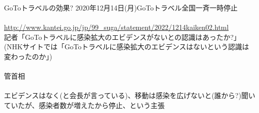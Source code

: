 \begin{frame}[t]{GoToトラベルの効果?}
2020年12月14日(月)GoToトラベル全国一斉一時停止\\~\\
\pause
{\footnotesize\url{http://www.kantei.go.jp/jp/99_suga/statement/2022/1214kaiken02.html}\\}
記者「GoToトラベルに感染拡大のエビデンスがないとの認識はあったか?」\\
(NHKサイトでは「GoToトラベルに感染拡大のエビデンスはないという認識は変わったのか」)\\~\\

\pause
管首相
\\~\\

\pause
エビデンスはなく(と会長が言っている)、移動は感染を広げないと(誰から?)聞いていたが、感染者数が増えたから停止、という主張
\end{frame}

